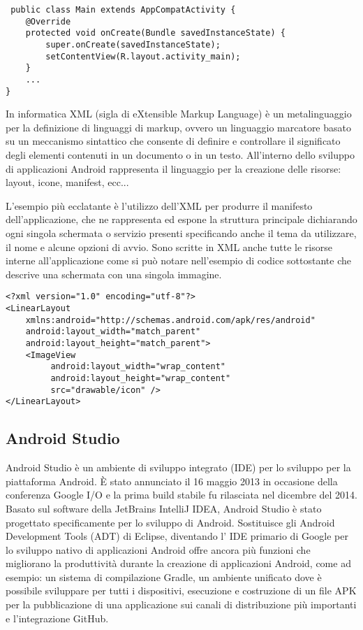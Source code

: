 \begin{lstlisting}
 public class Main extends AppCompatActivity {
    @Override
    protected void onCreate(Bundle savedInstanceState) {
        super.onCreate(savedInstanceState);
        setContentView(R.layout.activity_main);
    }
    ...
}
\end{lstlisting}
In informatica XML (sigla di eXtensible Markup Language) è un metalinguaggio
per la definizione di linguaggi di markup, ovvero un linguaggio marcatore
basato su un meccanismo sintattico che consente di definire e controllare
il significato degli elementi contenuti in un documento o in un testo.
All'interno dello sviluppo di applicazioni Android rappresenta il
linguaggio per la creazione delle risorse: layout, icone, manifest,
ecc...

L'esempio più ecclatante è l'utilizzo dell'XML per produrre il manifesto
dell'applicazione, che ne rappresenta ed espone la struttura principale
dichiarando ogni singola schermata o servizio presenti specificando
anche il tema da utilizzare, il nome e alcune opzioni di avvio. Sono
scritte in XML anche tutte le risorse interne all'applicazione come
si può notare nell'esempio di codice sottostante che descrive una
schermata con una singola immagine.

\begin{lstlisting}
<?xml version="1.0" encoding="utf-8"?>
<LinearLayout
    xmlns:android="http://schemas.android.com/apk/res/android"
    android:layout_width="match_parent"
    android:layout_height="match_parent">
    <ImageView
         android:layout_width="wrap_content"
         android:layout_height="wrap_content"
         src="drawable/icon" />
</LinearLayout>
\end{lstlisting}

\subsection{Android Studio}

Android Studio \autocite{WIKIPEDIA:ANDROIDSTUDIO} è un ambiente
di sviluppo integrato (IDE) per lo sviluppo per la piattaforma Android.
È stato annunciato il 16 maggio 2013 in occasione della conferenza
Google I/O e la prima build stabile fu rilasciata nel dicembre del
2014. Basato sul software della JetBrains IntelliJ IDEA, Android Studio
è stato progettato specificamente per lo sviluppo di Android. Sostituisce
gli Android Development Tools (ADT) di Eclipse, diventando l' IDE
primario di Google per lo sviluppo nativo di applicazioni Android
offre ancora più funzioni che migliorano la produttività durante la
creazione di applicazioni Android, come ad esempio: un sistema di
compilazione Gradle, un ambiente unificato dove è possibile sviluppare
per tutti i dispositivi, esecuzione e costruzione di un file APK per
la pubblicazione di una applicazione sui canali di distribuzione più
importanti e l'integrazione GitHub.

